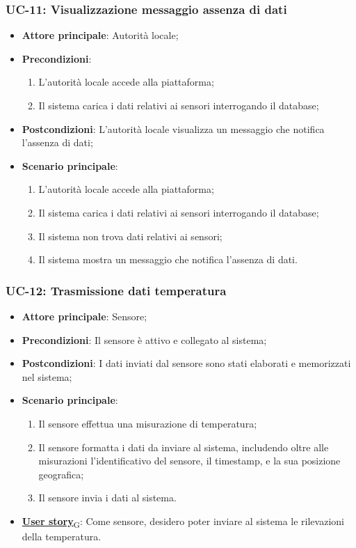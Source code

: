 \subsubsection{UC-11: Visualizzazione messaggio assenza di dati}
\begin{itemize}
	\item \textbf{Attore principale}: Autorità locale;
	\item \textbf{Precondizioni}:
	      \begin{enumerate}
		      \item L'autorità locale accede alla piattaforma;
		      \item Il sistema carica i dati relativi ai sensori interrogando il database;
	      \end{enumerate}
	\item \textbf{Postcondizioni}: L'autorità locale visualizza un messaggio che notifica l'assenza di dati;
	\item \textbf{Scenario principale}:
	      \begin{enumerate}
		      \item L'autorità locale accede alla piattaforma;
		      \item Il sistema carica i dati relativi ai sensori interrogando il database;
		      \item Il sistema non trova dati relativi ai sensori;
		      \item Il sistema mostra un messaggio che notifica l'assenza di dati.
	      \end{enumerate}
\end{itemize}

\subsubsection{UC-12: Trasmissione dati temperatura}
\begin{itemize}
	\item \textbf{Attore principale}: Sensore;
	\item \textbf{Precondizioni}: Il sensore è attivo e collegato al sistema;
	\item \textbf{Postcondizioni}: I dati inviati dal sensore sono stati elaborati e memorizzati nel sistema;
	\item \textbf{Scenario principale}:
	      \begin{enumerate}
		      \item Il sensore effettua una misurazione di temperatura;
		      \item Il sensore formatta i dati da inviare al sistema, includendo oltre alle misurazioni l'identificativo del sensore,
		            il timestamp, e la sua posizione geografica;
		      \item Il sensore invia i dati al sistema.
	      \end{enumerate}
	\item \href{https://7last.github.io/docs/rtb/documentazione-interna/glossario\#user-story}{\textbf{User story}\textsubscript{G}}: Come sensore, desidero poter inviare al sistema le rilevazioni della temperatura.
\end{itemize}

